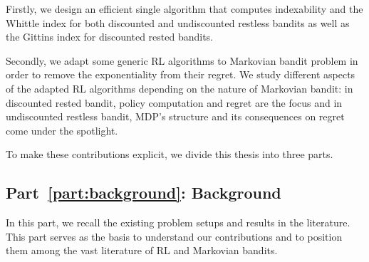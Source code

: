 
Firstly, we design an efficient single algorithm that computes indexability and the Whittle index for both discounted and undiscounted restless bandits as well as the Gittins index for discounted rested bandits.

Secondly, we adapt some generic RL algorithms to Markovian bandit problem in order to remove the exponentiality from their regret.
We study different aspects of the adapted RL algorithms depending on the nature of Markovian bandit: in discounted rested bandit, policy computation and regret are the focus and in undiscounted restless bandit, MDP's structure and its consequences on regret come under the spotlight.

To make these contributions explicit, we divide this thesis into three parts.

\subsection{Part~{\ref{part:background}}: Background}

In this part, we recall the existing problem setups and results in the literature.
This part serves as the basis to understand our contributions and to position them among the vast literature of RL and Markovian bandits.

